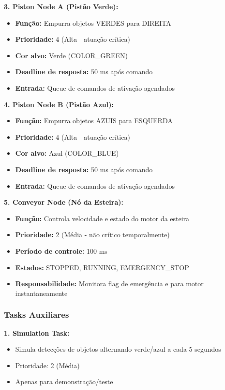 \documentclass[12pt,a4paper]{article}
\begin{document}
\textbf{3. Piston Node A (Pistão Verde):}
\begin{itemize}
    \item \textbf{Função:} Empurra objetos VERDES para DIREITA
    \item \textbf{Prioridade:} 4 (Alta - atuação crítica)
    \item \textbf{Cor alvo:} Verde (COLOR\_GREEN)
    \item \textbf{Deadline de resposta:} 50 ms após comando
    \item \textbf{Entrada:} Queue de comandos de ativação agendados
\end{itemize}

\textbf{4. Piston Node B (Pistão Azul):}
\begin{itemize}
    \item \textbf{Função:} Empurra objetos AZUIS para ESQUERDA
    \item \textbf{Prioridade:} 4 (Alta - atuação crítica)
    \item \textbf{Cor alvo:} Azul (COLOR\_BLUE)
    \item \textbf{Deadline de resposta:} 50 ms após comando
    \item \textbf{Entrada:} Queue de comandos de ativação agendados
\end{itemize}

\textbf{5. Conveyor Node (Nó da Esteira):}
\begin{itemize}
    \item \textbf{Função:} Controla velocidade e estado do motor da esteira
    \item \textbf{Prioridade:} 2 (Média - não crítico temporalmente)
    \item \textbf{Período de controle:} 100 ms
    \item \textbf{Estados:} STOPPED, RUNNING, EMERGENCY\_STOP
    \item \textbf{Responsabilidade:} Monitora flag de emergência e para motor instantaneamente
\end{itemize}

\subsubsection{Tasks Auxiliares}

\textbf{1. Simulation Task:}
\begin{itemize}
    \item Simula detecções de objetos alternando verde/azul a cada 5 segundos
    \item Prioridade: 2 (Média)
    \item Apenas para demonstração/teste
\end{itemize}
\end{document}
